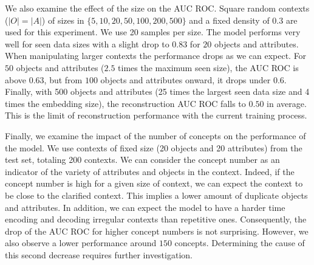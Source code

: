 We also examine the effect of the size on the AUC ROC.
Square random contexts ($|O|=|A|$) of sizes in $\{5,10,20,50,100,200,500\}$ and a fixed density of 0.3 are used for this experiment.
We use 20 samples per size.
The model performs very well for seen data sizes with a slight drop to $0.83$ for $20$ objects and attributes.
When manipulating larger contexts the performance drops as we can expect.
For $50$ objects and attributes ($2.5$ times the maximum seen size), the AUC ROC is above $0.63$, but from $100$ objects and attributes onward, it drops under $0.6$.
Finally, with 500 objects and attributes (25 times the largest seen data size and 4 times the embedding size), the reconstruction AUC ROC falls to $0.50$ in average.
This is the limit of reconstruction performance with the current training process.

Finally, we examine the impact of the number of concepts on the performance of the model.
We use contexts of fixed size (20 objects and 20 attributes) from the test set, totaling 200 contexts.
We can consider the concept number as an indicator of the variety of attributes and objects in the context.
Indeed, if the concept number is high for a given size of context, we can expect the context to be close to the clarified context. This implies a lower amount of duplicate objects and attributes.
In addition, we can expect the model to have a harder time encoding and decoding irregular contexts than repetitive ones.
Consequently, the drop of the AUC ROC for higher concept numbers is not surprising.
However, we also observe a lower performance around $150$ concepts.
Determining the cause of this second decrease requires further investigation.


